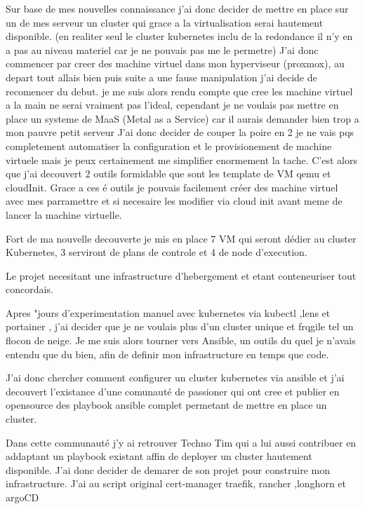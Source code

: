Sur base de mes nouvelles connaissance j'ai donc decider de mettre en place sur un de mes serveur un cluster qui grace a la virtualisation serai hautement disponible.
(en realiter seul le cluster kubernetes inclu de la redondance il n'y en a pas au niveau materiel car je ne pouvais pas me le permetre)
J'ai donc commencer par creer des machine virtuel dans mon hyperviseur (proxmox), au depart tout allais bien puis suite a une fause manipulation j'ai decide de recomencer du debut.
je me suis alors rendu compte que cree les machine virtuel a la main ne serai vraiment pas l'ideal,
cependant je ne voulais pas mettre en place un systeme de MaaS (Metal as a Service) car il aurais demander bien trop a mon pauvre petit serveur
J'ai donc decider de couper la poire en 2 je ne vais pqs completement automatiser la configuration et le provisionement de machine virtuele mais je peux certainement me simplifier enormement la tache.
C'est alors que j'ai decouvert 2 outils formidable que sont les template de VM qemu et cloudInit.
Grace a ces é outils je pouvais facilement créer des machine virtuel avec mes parramettre et si necesaire les modifier via cloud init avant meme de lancer la machine virtuelle.

Fort de ma nouvelle decouverte je mis en place 7 VM qui seront dédier au cluster Kubernetes, 3 serviront de plans de controle et 4 de node d'execution.

Le projet necesitant une infrastructure d'hebergement et etant conteneuriser tout concordais.

Apres "jours d'experimentation manuel avec kubernetes via kubectl ,lens et portainer , j'ai decider que je ne voulais plus d'un cluster unique et frqgile tel un flocon de neige.
Je me suis alors tourner vers Ansible, un outils du quel je n'avais entendu que du bien, afin de definir mon infrastructure en temps que code.

J'ai donc chercher comment configurer un cluster kubernetes via ansible et j'ai decouvert l'existance d'une comunauté de passioner
qui ont cree et publier en opensource des playbook ansible complet permetant de mettre en place un cluster.

Dans cette communauté j'y ai retrouver Techno Tim qui a lui aussi contribuer en addaptant un playbook existant affin de deployer un cluster hautement disponible.
J'ai donc decider de demarer de son projet pour construire mon infrastructure.
J'ai au script original cert-manager traefik, rancher ,longhorn et argoCD

